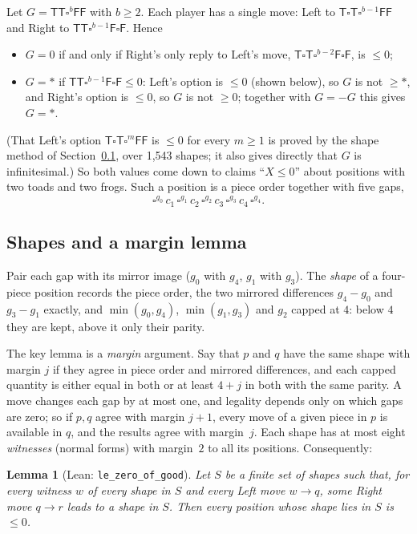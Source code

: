 \documentclass[11pt,a4paper]{article}
\newcommand{\Tt}{\mathsf{T}}
\newcommand{\Ff}{\mathsf{F}}
\newcommand{\E}{\square}
\newcommand{\lean}[1]{\texttt{#1}}
\theoremstyle{plain}
\newtheorem{lemma}[theorem]{Lemma}
\theoremstyle{remark}
\begin{document}
Let $G=\Tt\Tt\E^b\Ff\Ff$ with $b\ge 2$. Each player has a single move: Left to
$\Tt\E\Tt\E^{b-1}\Ff\Ff$ and Right to $\Tt\Tt\E^{b-1}\Ff\E\Ff$. Hence
\begin{itemize}
\item $G=0$ if and only if Right's only reply to Left's move, $\Tt\E\Tt\E^{b-2}\Ff\E\Ff$, is
  $\le0$;
\item $G=\ast$ if $\Tt\Tt\E^{b-1}\Ff\E\Ff\le 0$: Left's option is $\le 0$ (shown below), so $G$
  is not $\ge\ast$, and Right's option is $\le0$, so $G$ is not $\ge 0$; together with $G=-G$
  this gives $G=\ast$.
\end{itemize}
(That Left's option $\Tt\E\Tt\E^{m}\Ff\Ff$ is $\le 0$ for every $m\ge1$ is proved by the shape
method of Section~\ref{sec:shapes}, over 1,543 shapes; it also gives directly that $G$ is
infinitesimal.) So both values come down to claims ``$X\le0$'' about positions with two toads and
two frogs. Such a position is a piece order together with five gaps,
\[
\E^{g_0}\,c_1\,\E^{g_1}\,c_2\,\E^{g_2}\,c_3\,\E^{g_3}\,c_4\,\E^{g_4}.
\]

\subsection{Shapes and a margin lemma}\label{sec:shapes}

Pair each gap with its mirror image ($g_0$ with $g_4$, $g_1$ with $g_3$). The \emph{shape} of a
four-piece position records the piece order, the two mirrored differences $g_4-g_0$ and
$g_3-g_1$ exactly, and $\min(g_0,g_4)$, $\min(g_1,g_3)$ and $g_2$ capped at $4$: below $4$ they
are kept, above it only their parity.

The key lemma is a \emph{margin} argument. Say that $p$ and $q$ have the same shape with margin
$j$ if they agree in piece order and mirrored differences, and each capped quantity is either
equal in both or at least $4+j$ in both with the same parity. A move changes each gap by at most
one, and legality depends only on which gaps are zero; so if $p,q$ agree with margin $j+1$, every
move of a given piece in $p$ is available in $q$, and the results agree with margin~$j$. Each
shape has at most eight \emph{witnesses} (normal forms) with margin~$2$ to all its positions.
Consequently:

\begin{lemma}[Lean: \lean{le\_zero\_of\_good}]
Let $S$ be a finite set of shapes such that, for every witness $w$ of every shape in $S$ and
every Left move $w\to q$, some Right move $q\to r$ leads to a shape in $S$. Then every
position whose shape lies in $S$ is $\le0$.
\end{lemma}
\end{document}
